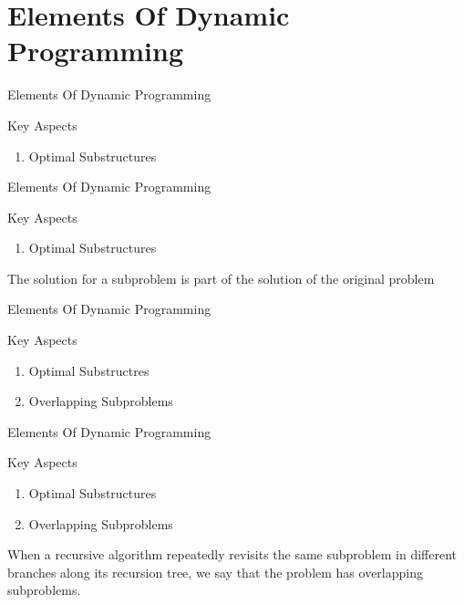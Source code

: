 \section{Elements Of Dynamic Programming}

\begin{frame}{Elements Of Dynamic Programming}
  \begin{block}{Key Aspects}
    \begin{enumerate}
      \item Optimal Substructures
    \end{enumerate}
  \end{block}
\end{frame}


\begin{frame}{Elements Of Dynamic Programming}
  \begin{block}{Key Aspects}
    \begin{enumerate}
      \item Optimal Substructures
    \end{enumerate}
    The solution for a subproblem is part of the solution of the original problem
  \end{block}
\end{frame}

\begin{frame}{Elements Of Dynamic Programming}
  \begin{block}{Key Aspects}
    \begin{enumerate}
      \item Optimal Substructres
      \item Overlapping Subproblems
    \end{enumerate}
  \end{block}
\end{frame}


\begin{frame}{Elements Of Dynamic Programming}
  \begin{block}{Key Aspects}
    \begin{enumerate}
      \item Optimal Substructures
      \item Overlapping Subproblems
    \end{enumerate}
    When a recursive algorithm repeatedly revisits the same subproblem in different branches along its recursion
    tree, we say that the problem has overlapping subproblems.
  \end{block}
\end{frame}


